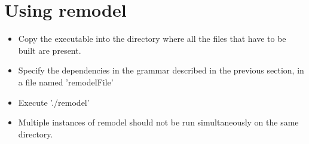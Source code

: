 \documentclass[a4paper, 12pt, notitlepage]{report}
\begin{document}
\section{Using remodel}
\begin{itemize}
\item Copy the executable into the directory where all the files that have to be built are present.
\item Specify the dependencies in the grammar described in the previous section, in a file named 'remodelFile' 
\item Execute './remodel'
\item Multiple instances of remodel should not be run simultaneously on the same directory.
\end{itemize}
\end{document}
